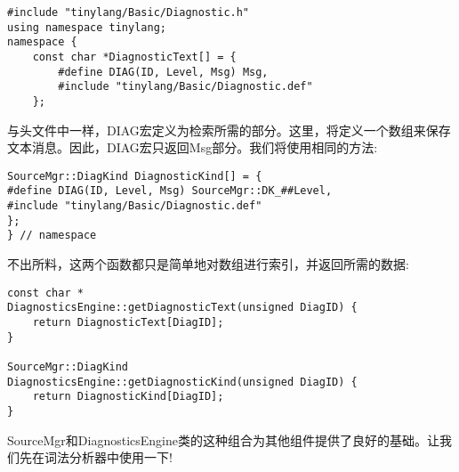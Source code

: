 \begin{lstlisting}[caption={}]
#include "tinylang/Basic/Diagnostic.h"
using namespace tinylang;
namespace {
	const char *DiagnosticText[] = {
		#define DIAG(ID, Level, Msg) Msg,
		#include "tinylang/Basic/Diagnostic.def"
	};
\end{lstlisting}

与头文件中一样，DIAG宏定义为检索所需的部分。这里，将定义一个数组来保存文本消息。因此，DIAG宏只返回Msg部分。我们将使用相同的方法:\par

\begin{lstlisting}[caption={}]
SourceMgr::DiagKind DiagnosticKind[] = {
#define DIAG(ID, Level, Msg) SourceMgr::DK_##Level,
#include "tinylang/Basic/Diagnostic.def"
};
} // namespace
\end{lstlisting}

不出所料，这两个函数都只是简单地对数组进行索引，并返回所需的数据:\par

\begin{lstlisting}[caption={}]
const char *
DiagnosticsEngine::getDiagnosticText(unsigned DiagID) {
	return DiagnosticText[DiagID];
}

SourceMgr::DiagKind
DiagnosticsEngine::getDiagnosticKind(unsigned DiagID) {
	return DiagnosticKind[DiagID];
}
\end{lstlisting}

SourceMgr和DiagnosticsEngine类的这种组合为其他组件提供了良好的基础。让我们先在词法分析器中使用一下!\par




















































